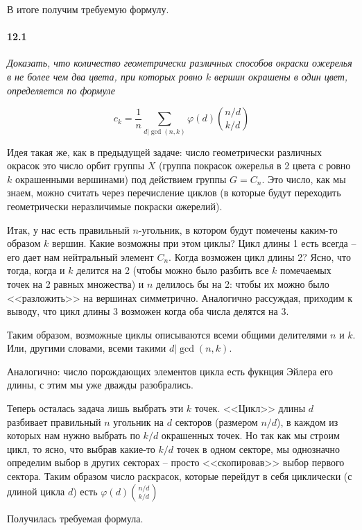 \documentclass[russian]{article}
\begin{document}
В итоге получим требуемую формулу.

\paragraph*{12.1}

\textit{Доказать, что количество геометрически различных способов окраски ожерелья в не более чем два цвета, при которых ровно $k$ вершин окрашены в один цвет, определяется по формуле}

\[
c_k = \frac{1}{n} \sum_{d | \gcd(n, k)}{\varphi(d) \binom{n/d}{k/d}}
\]

Идея такая же, как в предыдущей задаче: число геометрически различных окрасок это число орбит группы $X$ (группа покрасок ожерелья в 2 цвета с ровно $k$ окрашенными вершинами) под действием группы $G = C_n$. Это число, как мы знаем, можно считать через перечисление циклов (в которые будут переходить геометрически неразличимые покраски ожерелий). 

Итак, у нас есть правильный $n$-угольник, в котором будут помечены каким-то образом $k$ вершин. Какие возможны при этом циклы? Цикл длины 1 есть всегда -- его дает нам нейтральный элемент $C_n$. Когда возможен цикл длины 2? Ясно, что тогда, когда и $k$ делится на 2 (чтобы можно было разбить все $k$ помечаемых точек на 2 равных множества) и $n$ делилось бы на 2: чтобы их можно было <<разложить>> на вершинах симметрично. Аналогично рассуждая, приходим к выводу, что цикл длины 3 возможен когда оба числа делятся на 3. 

Таким образом, возможные циклы описываются всеми общими делителями $n$ и $k$. Или, другими словами, всеми такими $d | \gcd(n, k)$.

Аналогично: число порождающих элементов цикла есть фукнция Эйлера его длины, с этим мы уже дважды разобрались.

Теперь осталась задача лишь выбрать эти $k$ точек. <<Цикл>> длины $d$ разбивает правильный $n$ угольник на $d$ секторов (размером $n/d$), в каждом из которых нам нужно выбрать по $k/d$ окрашенных точек. Но так как мы строим цикл, то ясно, что выбрав какие-то $k/d$ точек в одном секторе, мы однозначно определим выбор в других секторах -- просто <<скопировав>> выбор первого сектора. Таким образом число раскрасок, которые перейдут в себя циклически (с длиной цикла $d$) есть $\varphi(d) \binom{n/d}{k/d}$

Получилась требуемая формула.
\end{document}
